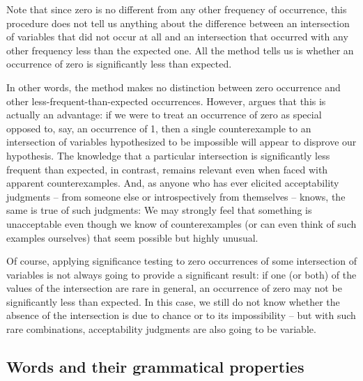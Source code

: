 Note that since zero is no different from any other frequency  of occurrence, this procedure does not tell us anything about the difference between an intersection of variables that did not occur at all and an intersection that occurred with any other frequency less than the expected  one. All the method tells us is whether an occurrence of zero is significantly less than expected.

In other words, the method makes no distinction between zero occurrence and other less\hyp{}frequent\hyp{}than\hyp{}expected  occurrences. However, \citet[70f]{stefanowitsch_negative_2006} argues that this is actually an advantage: if we were to treat an occurrence of zero as special opposed to, say, an occurrence of 1, then a single counterexample  to an intersection of variables hypothesized to be impossible will appear to disprove our hypothesis. The knowledge that a particular intersection is significantly less frequent than expected, in contrast, remains relevant even when faced with apparent counterexamples.  And, as anyone who has ever elicited  acceptability  judgments -- from someone else or introspectively  from themselves -- knows, the same is true of such judgments: We may strongly feel that something is unacceptable even though we know of counterexamples (or can even think of such examples ourselves) that seem possible but highly unusual.

Of course, applying significance testing to zero occurrences of some intersection of variables is not always going to provide a significant result: if one (or both) of the values of the intersection are rare in general, an occurrence of zero may not be significantly less than expected.  In this case, we still do not know whether the absence of the intersection is due to chance  or to its impossibility -- but with such rare combinations, acceptability  judgments are also going to be variable.

\subsection{Words and their grammatical properties}
\label{sec:wordsandtheirgrammaticalproperties}

